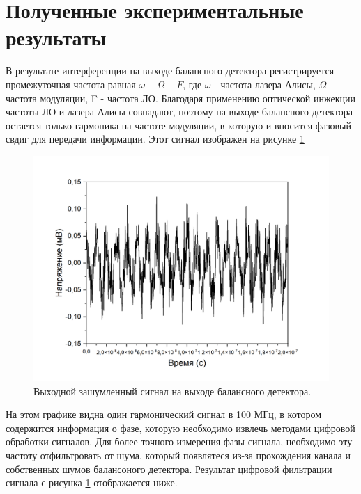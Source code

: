 \section{Полученные экспериментальные результаты}\label{sec:ch2/sect6}

В результате интерференции на выходе балансного детектора регистрируется промежуточная частота  равная $\omega + \Omega - F$, где $\omega$ - частота лазера Алисы, $\Omega$ - частота модуляции, F - частота ЛО. Благодаря применению оптической инжекции частоты ЛО и лазера Алисы совпадают, поэтому на выходе балансного детектора остается только гармоника на частоте модуляции, в которую и вносится фазовый свдиг для передачи информации. Этот сигнал изображен на рисунке \ref{fig:100 MHZ filt ch2}
\begin{figure}
    \centering
    \includegraphics[width=\textwidth]{images/сигнал после бд с новыми шкалами.png}
    \caption{Выходной зашумленный сигнал на выходе балансного детектора.}
    \label{fig:100 MHZ filt ch2}
\end{figure}
На этом графике видна один гармонический сигнал в 100 МГц, в котором содержится информация о фазе, которую необходимо извлечь методами цифровой обработки сигналов. Для более точного измерения фазы сигнала, необходимо эту частоту отфильтровать от шума, который появлятеся из-за прохождения канала и собственных шумов балансоного детектора. Результат цифровой фильтрации сигнала с рисунка  \ref{fig:100 MHZ filt ch2} отображается ниже. 
